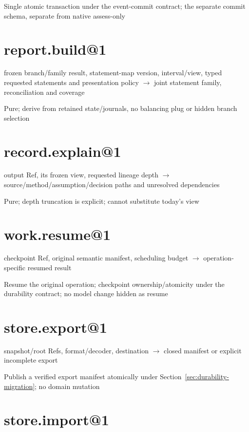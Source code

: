 Single atomic transaction under the event-commit contract; the separate commit schema, separate from native assess-only

\hypertarget{report.build1}{%
\section{report.build@1}\label{report.build1}}

frozen branch/family result, statement-map version, interval/view, typed requested statements and presentation policy \ensuremath{\rightarrow} joint statement family, reconciliation and coverage

Pure; derive from retained state/journals, no balancing plug or hidden branch selection

\hypertarget{record.explain1}{%
\section{record.explain@1}\label{record.explain1}}

output Ref, its frozen view, requested lineage depth \ensuremath{\rightarrow} source/method/assumption/decision paths and unresolved dependencies

Pure; depth truncation is explicit; cannot substitute today's view

\hypertarget{work.resume1}{%
\section{work.resume@1}\label{work.resume1}}

checkpoint Ref, original semantic manifest, scheduling budget \ensuremath{\rightarrow} operation-specific resumed result

Resume the original operation; checkpoint ownership/atomicity under the durability contract; no model change hidden as resume

\hypertarget{store.export1}{%
\section{store.export@1}\label{store.export1}}

snapshot/root Refs, format/decoder, destination \ensuremath{\rightarrow} closed manifest or explicit incomplete export

Publish a verified export manifest atomically under
Section~\ref{sec:durability-migration}; no domain mutation

\hypertarget{store.import1}{%
\section{store.import@1}\label{store.import1}}


